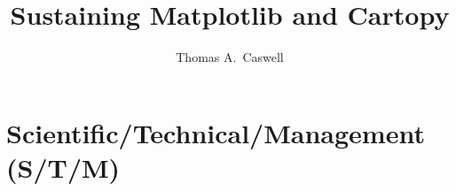 \documentclass[12pt]{article}
\numberwithin{page}{section}
\begin{document}
\title{Sustaining Matplotlib and Cartopy}
\author{Thomas A.\ Caswell}
\date{}
\maketitle

\setcounter{tocdepth}{2}
\tableofcontents
\thispagestyle{empty}
\newpage

\section{Scientific/Technical/Management (S/T/M)}
\setcounter{page}{1}
\end{document}
